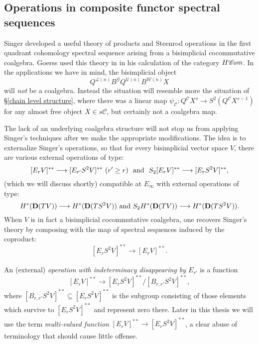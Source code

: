 \documentclass[11pt]{amsart} \renewcommand{\baselinestretch}{1.2}
\theoremstyle{plain}
\numberwithin{equation}{section} %
\theoremstyle{plain}
\numberwithin{equation}{chapter} %
\renewcommand{\to}{\longrightarrow}
\newcommand{\scrG}{\mathscr{G}}
\newcommand{\scrC}{\mathscr{C}}
\newcommand{\calU}{\mathcal{U}}
\newcommand{\calL}{\mathcal{L}}
\newcommand{\calw}{\mathcal{W}}
\newcommand{\calc}{\mathcal{C}}
\newcommand{\BSW}{{\scrG}}
\newcommand{\BSWres}{B^\BSW}%
\newcommand{\HA}[1]{H#1}
\newcommand{\algs}{{\scrC\!\textit{\normalfont\textit{om}}}}
\newcommand{\Edown}[4]{[E_{#1}#2]^{#3}_{#4}}
\newcommand{\EBdown}[4]{[B_{#1}#2]^{#3}_{#4}}
\newcommand{\dual}{\mathbf{D}}
\newcommand{\SectionOrChapter}[1]{\section{\textbf{#1}}}
\begin{document}
\begin{Operations in composite functor spectral sequences}
\SectionOrChapter{Operations in composite functor spectral sequences}
\label{Operations in composite functor spectral sequences}
Singer \cite{MR2245560} developed a useful theory of products and Steenrod operations in the first quadrant cohomology spectral sequence arising from a bisimplicial cocommutative coalgebra. Goerss used this theory in \cite[\S14]{MR1089001} in his calculation of the category $\HA{\algs}$.
 In the applications we have in mind, the bisimplicial object \[Q^{\calL(n)}\BSWres Q^{\calU(n)}{ B^{\calw(n)}X}\] 
will \emph{not} be a coalgebra. Instead the situation will resemble more the situation of \S\ref{chain level structure}, where there was a linear map $\psi_\calc:Q^{\calc}X^s\to S^2(Q^{\calc}X^{s-1})$ for any almost free object $X\in s\calc$, but certainly not a coalgebra map.


The lack of an underlying coalgebra structure will not stop us from applying Singer's techniques after we make the appropriate modifications. The idea is to externalize Singer's operations, so that for every bisimplicial vector space $V$, there are various external operations of type:
\[\Edown{r}{V}{**}{}\to \Edown{r'}{S^2V}{**}{}\ (r'\geq r)\textup{ \ and \ }S_2\Edown{r}{V}{**}{}\to \Edown{r}{S^2V}{**}{},\]
(which we will discuss shortly) compatible at $E_\infty$ with external operations of type:
\[H^*(\dual(TV))\to H^*(\dual(TS^2V))\textup{ and }S_2H^*(\dual(TV))\to H^*(\dual(TS^2V)).\]
When $V$ is  in fact a bisimplicial cocommutative coalgebra, one recovers Singer's theory by composing with the map of spectral sequences induced by the coproduct:
\[\Edown{r}{S^2V}{**}{}\to \Edown{r}{V}{**}{}.\]

An (external) \emph{operation with indeterminacy disappearing by $E_{r'}$} is a function
\[\Edown{r}{V}{**}{}\to \Edown{r}{S^2V}{**}{}/\EBdown{r,r'}{S^2V}{**}{},\]
where $\EBdown{r,r'}{S^2V}{**}{}\subseteq \Edown{r}{S^2V}{**}{}$ is the subgroup consisting of those elements which survive to $\Edown{r}{S^2V}{**}{}$ and represent zero there. Later in this thesis we will use the term \emph{multi-valued function} 
$\Edown{r}{V}{**}{}\to \Edown{r}{S^2V}{**}{}$, a clear abuse of terminology that should cause little offense.


\end{Operations in composite functor spectral sequences}
\end{document}
